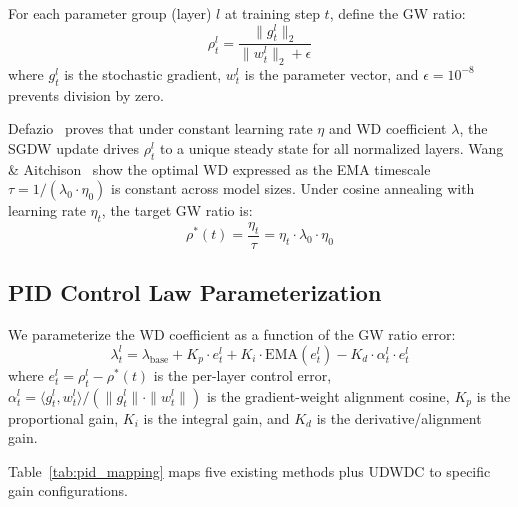 \documentclass{article}
\begin{document}
For each parameter group (layer) $l$ at training step $t$, define the GW ratio:
\begin{equation}
  \rho_t^l = \frac{\|g_t^l\|_2}{\|w_t^l\|_2 + \epsilon}
  \label{eq:gw_ratio}
\end{equation}
where $g_t^l$ is the stochastic gradient, $w_t^l$ is the parameter vector, and $\epsilon = 10^{-8}$ prevents division by zero.

Defazio~\citep{defazio2025gw} proves that under constant learning rate $\eta$ and WD coefficient $\lambda$, the SGDW update drives $\rho_t^l$ to a unique steady state for all normalized layers. Wang \& Aitchison~\citep{wang2025ema} show the optimal WD expressed as the EMA timescale $\tau = 1/(\lambda_0 \cdot \eta_0)$ is constant across model sizes. Under cosine annealing with learning rate $\eta_t$, the target GW ratio is:
\begin{equation}
  \rho^*(t) = \frac{\eta_t}{\tau} = \eta_t \cdot \lambda_0 \cdot \eta_0
  \label{eq:target}
\end{equation}

\subsection{PID Control Law Parameterization}

We parameterize the WD coefficient as a function of the GW ratio error:
\begin{equation}
  \lambda_t^l = \lambda_{\text{base}} + K_p \cdot e_t^l + K_i \cdot \text{EMA}(e_t^l) - K_d \cdot \alpha_t^l \cdot e_t^l
  \label{eq:pid}
\end{equation}
where $e_t^l = \rho_t^l - \rho^*(t)$ is the per-layer control error, $\alpha_t^l = \langle g_t^l, w_t^l \rangle / (\|g_t^l\| \cdot \|w_t^l\|)$ is the gradient-weight alignment cosine, $K_p$ is the proportional gain, $K_i$ is the integral gain, and $K_d$ is the derivative/alignment gain.

Table~\ref{tab:pid_mapping} maps five existing methods plus UDWDC to specific gain configurations.
\end{document}
